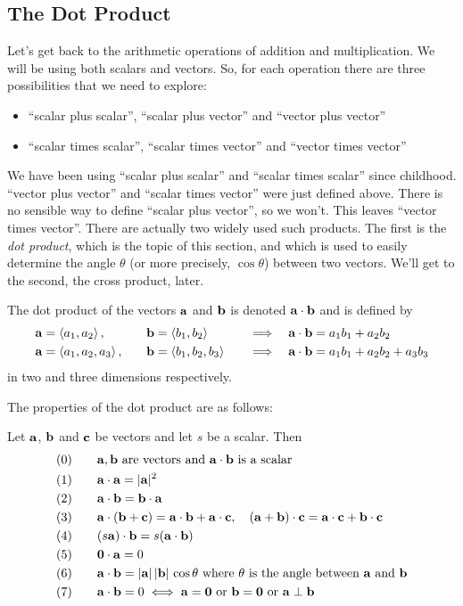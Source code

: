 \subsection{The Dot Product}
Let's get back to the arithmetic operations of addition and multiplication.
We will be using both scalars and vectors. So, for each operation there are 
three possibilities that we need to explore: 
\begin{itemize}\itemsep1pt \parskip0pt 
\item ``scalar plus scalar'', ``scalar plus vector'' and ``vector plus vector''
\item``scalar times scalar'', ``scalar times vector'' and 
         ``vector times vector''
\end{itemize}
We have been using ``scalar plus scalar'' and ``scalar times scalar''
since childhood. ``vector plus vector'' and ``scalar times vector''
were just defined above. There is no sensible way to define ``scalar plus vector'', so we won't. This leaves ``vector times vector''. 
There are actually two widely used such products.
The first is the \emph{dot product}, which is the topic of this section,
and which is used to easily determine the angle $\theta$ (or more precisely,
$\cos\theta$) between two vectors.
We'll get to the second, the cross product, later. 
\begin{defn}\label{def:dotProd}
The dot product of the vectors $\mathbf{a}$ and $\mathbf{b}$ is denoted $\mathbf{a}\cdot\mathbf{b}$ 
and is defined by
\begin{alignat*}{5}
&\mathbf{a}=\left< a_1,a_2\right> ,\quad &&\mathbf{b}=\left< b_1,b_2\right>\quad &\implies\quad
&\mathbf{a}\cdot\mathbf{b} = a_1b_1+a_2b_2\\
&\mathbf{a}=\left< a_1,a_2,a_3\right> ,\quad &&\mathbf{b}=\left< b_1,b_2,b_3\right>\quad &\implies\quad
&\mathbf{a}\cdot\mathbf{b} = a_1b_1+a_2b_2+a_3b_3
\end{alignat*}
in two and three dimensions respectively. 
\end{defn}
The properties of the dot 
product are as follows:
\begin{theorem}\label{thm:dotPppties}
Let $\mathbf{a}$, $\mathbf{b}$ and $\mathbf{c}$ be vectors and let $s$ be a scalar. Then
\begin{alignat*}{3}
&(0)\quad &&\mathbf{a},\mathbf{b}\text{ are vectors and }\mathbf{a}\cdot\mathbf{b}
              \text{ is a scalar}\\
&(1) &&\mathbf{a}\cdot\mathbf{a}=|\mathbf{a}|^2\\
&(2) &&\mathbf{a}\cdot\mathbf{b}=\mathbf{b}\cdot\mathbf{a}\\
&(3) &&\mathbf{a}\cdot(\mathbf{b}+\mathbf{c})=\mathbf{a}\cdot\mathbf{b}+\mathbf{a}\cdot\mathbf{c},\quad 
       (\mathbf{a}+\mathbf{b})\cdot\mathbf{c}=\mathbf{a}\cdot\mathbf{c}+\mathbf{b}\cdot\mathbf{c}\\
&(4) &&(s\mathbf{a})\cdot\mathbf{b}= s(\mathbf{a}\cdot\mathbf{b})\\
&(5)  &&\mathbf{0} \cdot\mathbf{a}=0\\
&(6) &&\mathbf{a}\cdot\mathbf{b}=|\mathbf{a}|\,|\mathbf{b}|\,\cos\theta
        \text{ where $\theta$ is the angle between $\mathbf{a}$ and $\mathbf{b}$}\\
&(7) &&\mathbf{a}\cdot\mathbf{b}=0\iff \mathbf{a}=\mathbf{0} \text{ or }\mathbf{b}=\mathbf{0} 
    \text{ or } \mathbf{a}\perp\mathbf{b}
\end{alignat*}
\end{theorem}
